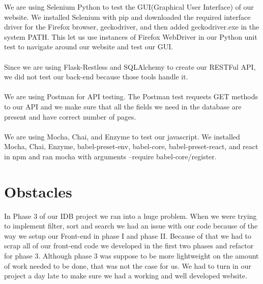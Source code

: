 \documentclass[12pt]{article}
\begin{document}
We are using Selenium Python to test the GUI(Graphical User Interface) of our website. We installed Selenium with pip and downloaded the required interface driver for the Firefox browser, geckodriver, and then added geckodriver.exe in the system PATH. This let us use instances of Firefox WebDriver in our Python unit test to navigate around our website and test our GUI.
\\
\\
Since we are using Flask-Restless and SQLAlchemy to create our RESTFul API, we did not test our back-end because those tools handle it.
\\
\\
We are using Postman for API testing. The Postman test requests GET methods to our API and we make sure that all the fields we need in the database are present and have correct number of pages. 
\\
\\
We are using Mocha, Chai, and Enzyme to test our javascript. We installed Mocha, Chai, Enzyme, babel-preset-env, babel-core, babel-preset-react, and react in npm and ran mocha with arguments --require babel-core/register.

\section{Obstacles}
In Phase 3 of our IDB project we ran into a huge problem. When we were trying to implement filter, sort and search we had an issue with our code because of the way we setup our Front-end in phase I and phase II. Because of that we had to scrap all of our front-end code we developed in the first two phases and refactor for phase 3. Although phase 3 was suppose to be more lightweight on the amount of work needed to be done, that was not the case for us. We had to turn in our project a day late to make sure we had a working and well developed website.
\end{document}
